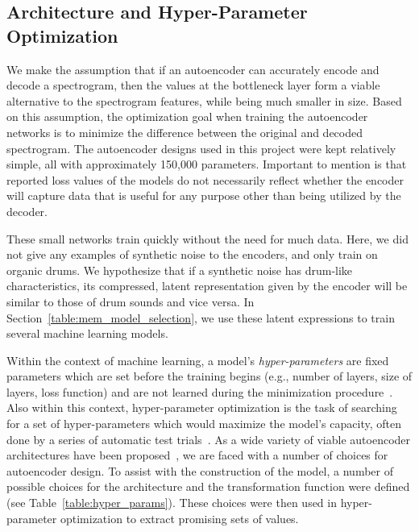 \documentclass[\main/thesis.tex]{subfiles}
\begin{document}
\subsection{Architecture and Hyper-Parameter Optimization}
We make the assumption that if an autoencoder can accurately encode and decode a spectrogram, then the values at the bottleneck layer form a viable alternative to the spectrogram features, while being much smaller in size. Based on this assumption, the optimization goal when training the autoencoder networks is to minimize the difference between the original and decoded spectrogram.  The autoencoder designs used in this project were kept relatively simple, all with approximately 150,000 parameters. Important to mention is that reported loss values of the models do not necessarily reflect whether the encoder will capture data that is useful for any purpose other than being utilized by the decoder. 

These small networks train quickly without the need for much data. Here, we did not give any examples of synthetic noise to the encoders, and only train on organic drums. We hypothesize that if a synthetic noise has drum-like characteristics, its compressed, latent representation given by the encoder will be similar to those of drum sounds and vice versa. In Section~\ref{table:mem_model_selection}, we use these latent expressions to train several machine learning models.

Within the context of machine learning, a model's \emph{hyper-parameters} are fixed parameters which are set before the training begins (e.g., number of layers, size of layers, loss function) and are not learned during the minimization procedure~\cite{bengio2000gradient}. Also within this context, hyper-parameter optimization is the task of searching for a set of hyper-parameters which would maximize the model's capacity, often done by a series of automatic test trials~\cite{bengio2000gradient,bergstra2011algorithms,bergstra2012random}. As a wide variety of viable autoencoder architectures have been proposed~\cite{aouameur2019neural,esling2018generative,gensler2016deep,zhang2016facing,pu2016variational}, we are faced with a number of choices for autoencoder design. To assist with the construction of the model, a number of possible choices for the architecture and the transformation function were defined (see Table~\ref{table:hyper_params}). These choices were then used in hyper-parameter optimization to extract promising sets of values. 
\end{document}
